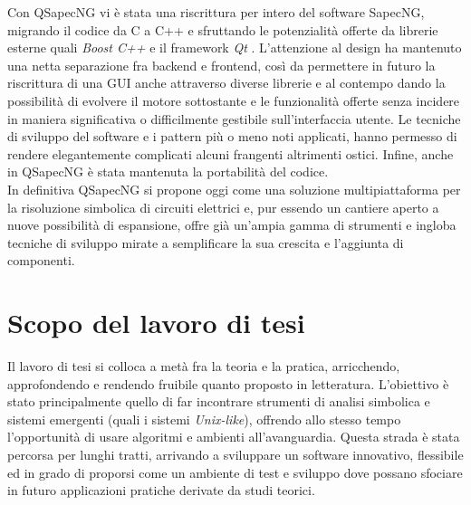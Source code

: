 Con QSapecNG vi è stata una riscrittura per intero del software SapecNG, migrando il codice da C a C++ e sfruttando le potenzialità offerte da librerie esterne quali \textit{Boost C++} \cite{BGL} e il framework \textit{Qt} \cite{Qt}. L'attenzione al design ha mantenuto una netta separazione fra backend e frontend, così da permettere in futuro la riscrittura di una GUI anche attraverso diverse librerie e al contempo dando la possibilità di evolvere il motore sottostante e le funzionalità offerte senza incidere in maniera significativa o difficilmente gestibile sull'interfaccia utente. Le tecniche di sviluppo del software e i pattern più o meno noti applicati, hanno permesso di rendere elegantemente complicati alcuni frangenti altrimenti ostici. Infine, anche in QSapecNG è stata mantenuta la portabilità del codice.\\
In definitiva QSapecNG si propone oggi come una soluzione multipiattaforma per la risoluzione simbolica di circuiti elettrici e, pur essendo un cantiere aperto a nuove possibilità di espansione, offre già un'ampia gamma di strumenti e ingloba tecniche di sviluppo mirate a semplificare la sua crescita e l'aggiunta di componenti.


\section{Scopo del lavoro di tesi}

Il lavoro di tesi si colloca a metà fra la teoria e la pratica, arricchendo, approfondendo e rendendo fruibile quanto proposto in letteratura. L'obiettivo è stato principalmente quello di far incontrare strumenti di analisi simbolica e sistemi emergenti (quali i sistemi \textit{Unix-like}), offrendo allo stesso tempo l'opportunità di usare algoritmi e ambienti all'avanguardia. Questa strada è stata percorsa per lunghi tratti, arrivando a sviluppare un software innovativo, flessibile ed in grado di proporsi come un ambiente di test e sviluppo dove possano sfociare in futuro applicazioni pratiche derivate da studi teorici.

